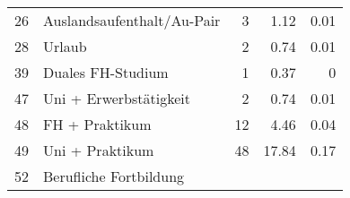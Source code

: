 \begin{longtable}{lXrrr}
     26 &
     \multicolumn{1}{X}{ Auslandsaufenthalt/Au-Pair   } &


       \num{3} &
       \num[round-mode=places,round-precision=2]{1.12} &
         \num[round-mode=places,round-precision=2]{0.01} \\

     28 &
     \multicolumn{1}{X}{ Urlaub   } &


       \num{2} &
       \num[round-mode=places,round-precision=2]{0.74} &
         \num[round-mode=places,round-precision=2]{0.01} \\

     39 &
     \multicolumn{1}{X}{ Duales FH-Studium   } &


       \num{1} &
       \num[round-mode=places,round-precision=2]{0.37} &
         \num[round-mode=places,round-precision=2]{0} \\

     47 &
     \multicolumn{1}{X}{ Uni + Erwerbstätigkeit   } &


       \num{2} &
       \num[round-mode=places,round-precision=2]{0.74} &
         \num[round-mode=places,round-precision=2]{0.01} \\

     48 &
     \multicolumn{1}{X}{ FH + Praktikum   } &


       \num{12} &
       \num[round-mode=places,round-precision=2]{4.46} &
         \num[round-mode=places,round-precision=2]{0.04} \\

     49 &
     \multicolumn{1}{X}{ Uni + Praktikum   } &


       \num{48} &
       \num[round-mode=places,round-precision=2]{17.84} &
         \num[round-mode=places,round-precision=2]{0.17} \\

     52 &
     \multicolumn{1}{X}{ Berufliche Fortbildung   } &



\end{longtable}
